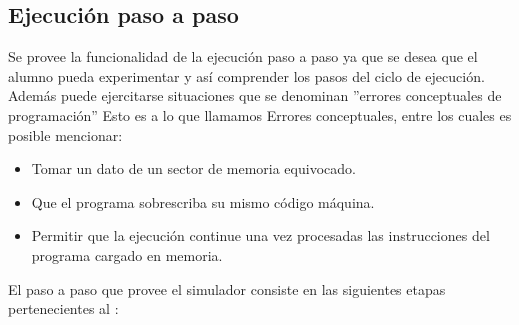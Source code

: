 \subsection{Ejecución paso a paso}

Se provee la funcionalidad de la ejecución paso a paso ya que se desea que el alumno pueda experimentar y así comprender los pasos del ciclo de ejecución. Además puede ejercitarse situaciones que se denominan ''errores conceptuales de programación'' Esto es a lo que llamamos Errores conceptuales, entre los cuales es posible mencionar:

\begin{itemize}
\item Tomar un dato de un sector de memoria equivocado.
\item Que el programa sobrescriba su mismo código máquina.
\item Permitir que la ejecución continue una vez procesadas las instrucciones del programa cargado en memoria.
\end{itemize}

El paso a paso que provee el simulador consiste en las siguientes etapas pertenecientes al \ciclo:

